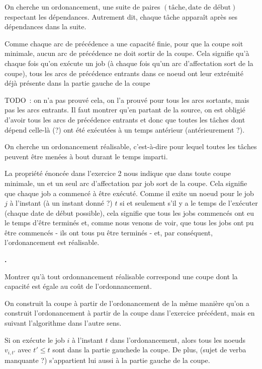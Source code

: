 \documentclass{article}
\newcounter{enoncecount}
\newenvironment{enonce}
{
\stepcounter{enoncecount}
\bf\small \arabic{enoncecount}.
\begin{bf}
}
{
\end{bf}
}
\begin{document}
On cherche un ordonancement, une suite de paires
$(\text{tâche},\text{date de début})$ respectant les dépendances. 
Autrement dit, chaque tâche apparaît après ses dépendances dans la
suite.

Comme chaque arc de précédence a une capacité finie, pour que la coupe
soit minimale, aucun arc de précédence ne doit sortir de la
coupe. Cela signifie qu'à chaque fois qu'on exécute un job (à
chaque fois qu'un arc d'affectation sort de la coupe), tous les arcs
de précédence entrants dans ce noeud ont leur extrémité déjà présente
dans la partie \og gauche \fg de la coupe 

TODO~: on n'a pas prouvé
cela, on l'a prouvé pour tous les arcs sortants, mais pas les arcs entrants. Il faut
montrer qu'en partant de la source, on est obligié d'avoir tous les
arcs de précédence entrants et donc que toutes les tâches dont dépend
celle-là (?) ont été exécutées à un temps antérieur (antérieurement ?).

On cherche un ordonancement réalisable, c'est-à-dire pour lequel
toutes les tâches peuvent être menées à bout durant le temps
imparti.

La propriété énoncée dans l'exercice 2 nous indique que dans toute
coupe minimale, un et un seul arc d'affectation par job sort de la
coupe. Cela signifie que chaque job a commencé à être exécuté. Comme
il exite un noeud pour le job $j$ à l'instant (à un instant donné ?) $t$ si et seulement s'il
y a le temps de l'exécuter ( chaque date de début possible\fg),
cela signifie que tous les jobs commencés ont eu le temps d'être
terminés et, comme nous venons de voir, que tous les jobs ont pu être
commencés - ils ont tous pu être terminés - et, par conséquent, l'ordonancement est
réalisable.

\begin{enonce}
Montrer qu'à tout ordonnancement réalisable correspond une coupe dont la capacité est égale au coût de l'ordonnancement.
\end{enonce}

On construit la coupe à partir de l'ordonancement de la même manière
qu'on a construit l'ordonancement à partir de la coupe dans l'exercice
précédent, mais en suivant l'algorithme dans l'autre sens.

Si on exécute le job $i$ à l'instant $t$ dans l'ordonancement, alors
tous les noeuds $v_{i,t'}$ avec $t' \leq t$ sont dans la partie \og
gauche\fg de la coupe. De plus, (sujet de verba manquante ?) s'appartient lui aussi à la partie
gauche de la coupe.
\end{document}
